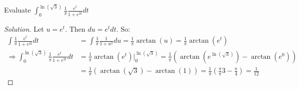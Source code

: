 \documentclass[crop=false,class=book,oneside]{standalone}
\begin{document}
\begin{problem}
Evaluate $\int_{0}^{\ln(\sqrt{3})}\frac{1}{\pi}\frac{e^{t}}{1+e^{2t}}dt$
\end{problem}
\begin{proof}[Solution]
Let $u=e^{t}$. Then $du=e^{t}dt$. So:
\begin{align*}
    \int\frac{1}{\pi}\frac{e^{t}}{1+e^{2t}}dt&=\int\frac{1}{\pi}\frac{1}{1+u^{2}}du=\frac{1}{\pi}\arctan(u)=\frac{1}{\pi}\arctan(e^{t})\\
    \Rightarrow\int_{0}^{\ln(\sqrt{3})}\frac{1}{\pi}\frac{e^{t}}{1+e^{2t}}dt&=\frac{1}{\pi}\arctan(e^{t})\big|_{0}^{\ln(\sqrt{3})}=\frac{1}{\pi}(\arctan(e^{\ln(\sqrt{3})})-\arctan(e^{0}))\\
    &=\frac{1}{\pi}(\arctan(\sqrt{3})-\arctan(1))=\frac{1}{\pi}(\frac{\pi}{\pi}{3}-\frac{\pi}{4})=\frac{1}{12}
\end{align*}
\end{proof}
\newpage
\end{document}
